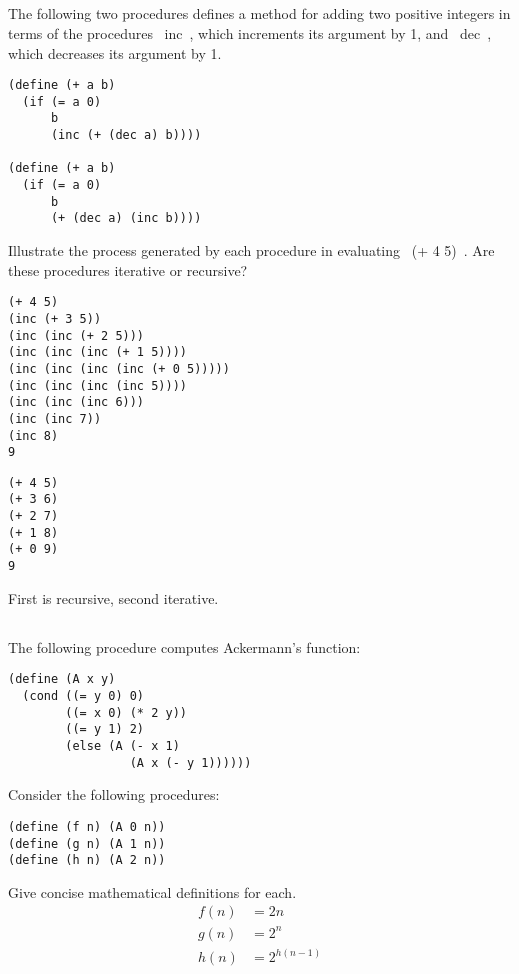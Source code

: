 \documentclass{article}
\begin{document}
\pagebreak
\subsection{}
The following two procedures defines a method for adding two positive integers in terms of the procedures ~inc~, which increments its argument by 1, and ~dec~, which decreases its argument by 1.
\begin{lstlisting}
(define (+ a b)
  (if (= a 0)
      b
      (inc (+ (dec a) b))))

(define (+ a b)
  (if (= a 0)
      b
      (+ (dec a) (inc b))))
\end{lstlisting}
Illustrate the process generated by each procedure in evaluating ~(+ 4 5)~. Are these procedures iterative or recursive?
\begin{multicols}{2}
\begin{lstlisting}
(+ 4 5)
(inc (+ 3 5))
(inc (inc (+ 2 5)))
(inc (inc (inc (+ 1 5))))
(inc (inc (inc (inc (+ 0 5)))))
(inc (inc (inc (inc 5))))
(inc (inc (inc 6)))
(inc (inc 7))
(inc 8)
9
\end{lstlisting}
\columnbreak
\begin{lstlisting}
(+ 4 5)
(+ 3 6)
(+ 2 7)
(+ 1 8)
(+ 0 9)
9
\end{lstlisting}
\end{multicols}
First is recursive, second iterative.

\subsection{}
The following procedure computes Ackermann's function:
\begin{lstlisting}
(define (A x y)
  (cond ((= y 0) 0)
        ((= x 0) (* 2 y))
        ((= y 1) 2)
        (else (A (- x 1)
                 (A x (- y 1))))))
\end{lstlisting}
Consider the following procedures:
\begin{lstlisting}
(define (f n) (A 0 n))
(define (g n) (A 1 n))
(define (h n) (A 2 n))
\end{lstlisting}
Give concise mathematical definitions for each.
\begin{align}
    f(n) &= 2n \\
    g(n) &= 2^n \\
    h(n) &= 2^{h(n-1)}
\end{align}

\pagebreak
\end{document}
